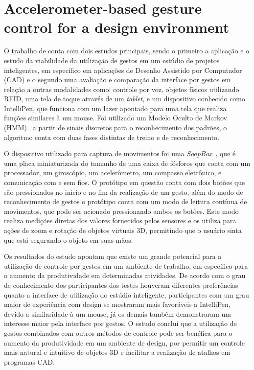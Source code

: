 \section{Accelerometer-based gesture control for a design environment}

O trabalho de  conta com dois estudos principais, sendo o primeiro a aplicação e o estudo da viabilidade da utilização de gestos em um estúdio de projetos inteligentes, em específico em aplicações de Desenho Assistido por Computador (CAD) e o segundo uma avaliação e comparação da interface por gestos em relação a outras modalidades como: controle por voz, objetos físicos utilizando RFID, uma tela de toque através de um \textit{tablet}, e um dispositivo conhecido como IntelliPen, que funciona com um lazer apontado para uma tela que realiza funções similares à um mouse. Foi utilizado um Modelo Oculto de Markov (HMM)~\cite{hmm:1989} a partir de sinais discretos para o reconhecimento dos padrões, o algoritmo conta com duas fases distintas de treino e de reconhecimento.


O dispositivo utilizado para captura de movimentos foi uma \textit{SoapBox}~\cite{soapbox:2002}, que é uma placa miniaturizada do tamanho de uma caixa de fósforos que conta com um processador, um giroscópio, um acelerômetro, um compasso eletrônico, e comunicação com e sem fios. O protótipo em questão conta com dois botões que são pressionados no inicio e no fim da realização de um gesto, além do modo de reconhecimento de gestos o protótipo conta com um modo de leitura contínua de movimentos, que pode ser acionado pressionando ambos os botões. Este modo realiza medições diretas dos valores fornecidos pelos sensores e os utiliza para ações de zoom e rotação de objetos virtuais 3D, permitindo que o usuário sinta que está segurando o objeto em suas mãos.

Os resultados do estudo apontam que existe um grande potencial para a utilização de controle por gestos em um ambiente de trabalho, em específico para o aumento da produtividade em determinadas atividades. De acordo com o grau de conhecimento dos participantes dos testes houveram diferentes preferências quanto a interface de utilização do estúdio inteligente, participantes com um grau maior de experiência com design se mostraram mais favoráveis a IntelliPen, devido a similaridade à um mouse, já os demais também demonstraram um interesse maior pela interface por gestos. 
% 
O estudo conclui que a utilização de gestos combinados com outros métodos de controle pode ser benéfica para o aumento da produtividade em um ambiente de design, por permitir um controle mais natural e intuitivo de objetos 3D e facilitar a realização de atalhos em programas CAD.

